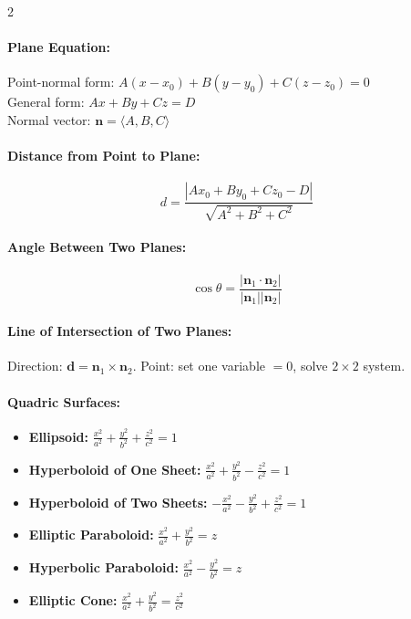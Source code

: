 \begin{multicols}{2}
\paragraph{Plane Equation:}
Point-normal form: $A(x-x_0)+B(y-y_0)+C(z-z_0)=0$\\
General form: $Ax + By + Cz = D$\\
Normal vector: $\mathbf{n} = \langle A,B,C\rangle$

\paragraph{Distance from Point to Plane:}
\[
d = \frac{|Ax_0 + By_0 + Cz_0 - D|}{\sqrt{A^2+B^2+C^2}}
\]

\paragraph{Angle Between Two Planes:}
\[
\cos\theta = \frac{|\mathbf{n}_1\cdot\mathbf{n}_2|}{|\mathbf{n}_1||\mathbf{n}_2|}
\]

\paragraph{Line of Intersection of Two Planes:}
Direction: $\mathbf{d} = \mathbf{n}_1 \times \mathbf{n}_2$. Point: set one variable $= 0$, solve $2\times 2$ system.

\paragraph{Quadric Surfaces:}
\begin{itemize}
    \item \textbf{Ellipsoid:} \(\frac{x^2}{a^2} + \frac{y^2}{b^2} + \frac{z^2}{c^2} = 1\)
    \item \textbf{Hyperboloid of One Sheet:} \(\frac{x^2}{a^2} + \frac{y^2}{b^2} - \frac{z^2}{c^2} = 1\)
    \item \textbf{Hyperboloid of Two Sheets:} \(-\frac{x^2}{a^2} - \frac{y^2}{b^2} + \frac{z^2}{c^2} = 1\)
    \item \textbf{Elliptic Paraboloid:} \(\frac{x^2}{a^2} + \frac{y^2}{b^2} = z\)
    \item \textbf{Hyperbolic Paraboloid:} \( \frac{x^2}{a^2} - \frac{y^2}{b^2} = z \)
    \item \textbf{Elliptic Cone:} \( \frac{x^2}{a^2} + \frac{y^2}{b^2} = \frac{z^2}{c^2} \)
\end{itemize}
\end{multicols}



